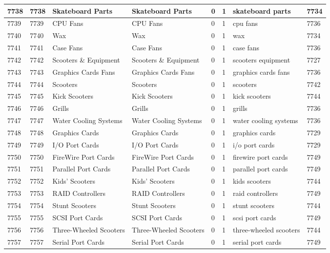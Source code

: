 \begin{longtable}{|l|l|l|l|l|l|l|l|}
7738 & 7738 & Skateboard Parts & Skateboard Parts & 0 & 1 & skateboard parts & 7734 \\ \hline 
7739 & 7739 & CPU Fans & CPU Fans & 0 & 1 & cpu fans & 7736 \\ \hline 
7740 & 7740 & Wax & Wax & 0 & 1 & wax & 7734 \\ \hline 
7741 & 7741 & Case Fans & Case Fans & 0 & 1 & case fans & 7736 \\ \hline 
7742 & 7742 & Scooters \& Equipment & Scooters \& Equipment & 0 & 1 & scooters equipment & 7727 \\ \hline 
7743 & 7743 & Graphics Cards Fans & Graphics Cards Fans & 0 & 1 & graphics cards fans & 7736 \\ \hline 
7744 & 7744 & Scooters & Scooters & 0 & 1 & scooters & 7742 \\ \hline 
7745 & 7745 & Kick Scooters & Kick Scooters & 0 & 1 & kick scooters & 7744 \\ \hline 
7746 & 7746 & Grills & Grills & 0 & 1 & grills & 7736 \\ \hline 
7747 & 7747 & Water Cooling Systems & Water Cooling Systems & 0 & 1 & water cooling systems & 7736 \\ \hline 
7748 & 7748 & Graphics Cards & Graphics Cards & 0 & 1 & graphics cards & 7729 \\ \hline 
7749 & 7749 & I/O Port Cards & I/O Port Cards & 0 & 1 & i/o port cards & 7729 \\ \hline 
7750 & 7750 & FireWire Port Cards & FireWire Port Cards & 0 & 1 & firewire port cards & 7749 \\ \hline 
7751 & 7751 & Parallel Port Cards & Parallel Port Cards & 0 & 1 & parallel port cards & 7749 \\ \hline 
7752 & 7752 & Kids' Scooters & Kids' Scooters & 0 & 1 & kids scooters & 7744 \\ \hline 
7753 & 7753 & RAID Controllers & RAID Controllers & 0 & 1 & raid controllers & 7749 \\ \hline 
7754 & 7754 & Stunt Scooters & Stunt Scooters & 0 & 1 & stunt scooters & 7744 \\ \hline 
7755 & 7755 & SCSI Port Cards & SCSI Port Cards & 0 & 1 & scsi port cards & 7749 \\ \hline 
7756 & 7756 & Three-Wheeled Scooters & Three-Wheeled Scooters & 0 & 1 & three-wheeled scooters & 7744 \\ \hline 
7757 & 7757 & Serial Port Cards & Serial Port Cards & 0 & 1 & serial port cards & 7749 \\ \hline 

\end{longtable}
